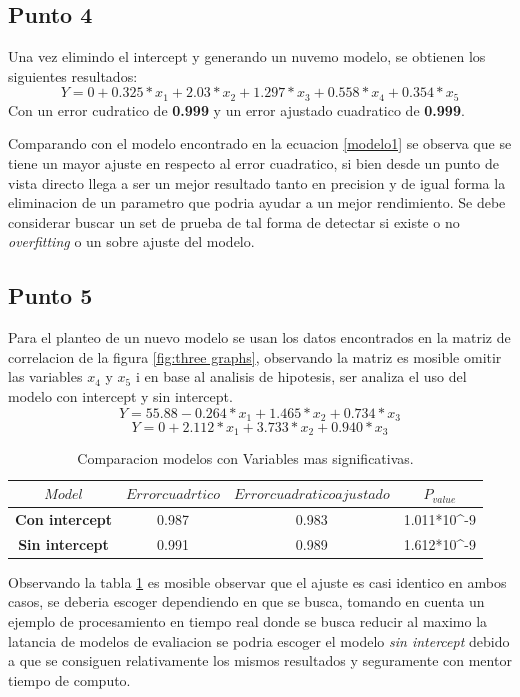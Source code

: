 \documentclass[a4paper]{article}
\begin{document}
\subsection{Punto 4}
Una vez elimindo el intercept y generando un nuvemo modelo, se obtienen los siguientes resultados:\\
\begin{equation}
    Y=0+0.325*x_1 + 2.03*x_2 + 1.297*x_3 + 0.558*x_4 + 0.354*x_5 
\end{equation}
Con un error cudratico de \textbf{0.999} y un error ajustado cuadratico de \textbf{0.999}.

Comparando con el modelo encontrado en la ecuacion \ref{modelo1} se observa que se tiene un mayor ajuste en respecto al error cuadratico, si bien desde un punto de vista directo llega a ser un mejor resultado tanto en precision y de igual forma la eliminacion de un parametro que podria ayudar a un mejor rendimiento. Se debe considerar buscar un set de prueba de tal forma de detectar si existe o no \textit{overfitting} o un sobre ajuste del modelo.
\subsection{Punto 5}
Para el planteo de un nuevo modelo se usan los datos encontrados en la matriz de correlacion de la figura \ref{fig:three graphs}, observando la matriz es mosible omitir las variables \textbf{$x_4$} y \textbf{$x_5$} i en base al analisis de hipotesis, ser analiza el uso del modelo con intercept y sin intercept.\\
\begin{equation}
    Y=55.88-0.264*x_1 + 1.465*x_2 + 0.734*x_3
    \label{best1}
\end{equation}
\begin{equation}
    Y=0+2.112*x_1 + 3.733*x_2 + 0.940*x_3
    \label{best2}
\end{equation}


\begin{table}[h!]
\centering
\begin{tabular}{||c c c c||} 
 \hline
 \textbf{$Model$} & \textbf{$Error cuadrtico$} & \textbf{$Error cuadratico ajustado$} & \textbf{$P_{value}$} \\ [0.5ex] 
 \hline\hline
 \textbf{Con intercept }& 0.987 & 0.983 & 1.011*10^{-9}\\
 \textbf{Sin intercept }& 0.991 &  0.989 & 1.612*10^{-9}\\
 
 \hline
\end{tabular}
\caption{Comparacion modelos con Variables mas significativas.}
\label{table:var1}
\end{table}
Observando la tabla \ref{table:var1} es mosible observar que el ajuste es casi identico en ambos casos, se deberia escoger dependiendo en que se busca, tomando en cuenta un ejemplo de procesamiento en tiempo real donde se busca reducir al maximo la latancia de modelos de evaliacion se podria escoger el modelo \textit{sin intercept} debido a que se consiguen relativamente los mismos resultados y seguramente con mentor tiempo de computo.
\end{document}
